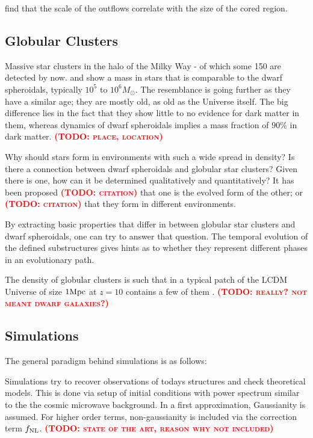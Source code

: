\documentclass[useAMS,usenatbib]{mn2e}
\newcommand{\TODO}[1]{\textsc{\textbf{\textcolor{red}{(TODO: #1)}}}}
\begin{document}
\cite{Teyssier+2013} find that the scale of the outflows correlate
with the size of the cored region.

\subsection{Globular Clusters}
Massive star clusters in the halo of the Milky Way - of which some 150
are detected by now. \citep{Zinn1985} and \citep{DeAngeli2005} show a
mass in stars that is comparable to the dwarf spheroidals, typically
$10^5$ to $10^6M_\odot$. The resemblance is going further as they have
a similar age; they are mostly old, as old as the Universe itself. The
big difference lies in the fact that they show little to no evidence
for dark matter in them, whereas dynamics of dwarf spheroidals implies
a mass fraction of $90\%$ in dark matter. \TODO{place, location}

Why should stars form in environments with such a wide spread in
density? Is there a connection between dwarf spheroidals and globular
star clusters? Given there is one, how can it be determined
qualitatively and quantitatively? It has been proposed \TODO{citation}
that one is the evolved form of the other; or \TODO{citation} that they
form in different environments.

By extracting basic properties that differ in between globular star
clusters and dwarf spheroidals, one can try to answer that
question. The temporal evolution of the defined substructures gives
hints as to whether they represent different phases in an evolutionary
path.

The density of globular clusters is such that in a typical patch of
the LCDM Universe of size $1\rm Mpc$ at $z=10$ contains a few of them
\citep{Boley2009}. \TODO{really? not meant dwarf galaxies?}

\subsection{Simulations}
The general paradigm behind simulations is as follows:

Simulations try to recover observations of todays structures and check
theoretical models. This is done via setup of initial conditions with
power spectrum similar to the the cosmic microwave background. In a
first approximation, Gaussianity is assumed. For higher order terms,
non-gaussianity is included via the correction term $f_{\rm NL}$.
\TODO{state of the art, reason why not included}
  
\end{document}
